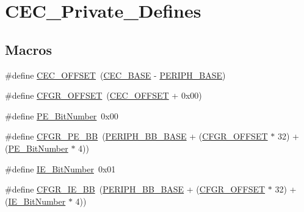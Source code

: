 \hypertarget{group___c_e_c___private___defines}{}\section{C\+E\+C\+\_\+\+Private\+\_\+\+Defines}
\label{group___c_e_c___private___defines}
\subsection*{Macros}
\begin{DoxyCompactItemize}
\item 
\#define \mbox{\hyperlink{group___c_e_c___private___defines_ga675324bd8967b75f32554f50210821af}{C\+E\+C\+\_\+\+O\+F\+F\+S\+ET}}~(\mbox{\hyperlink{group___peripheral__memory__map_gaacb77bc44b3f8c87ab98f241e760e440}{C\+E\+C\+\_\+\+B\+A\+SE}} -\/ \mbox{\hyperlink{group___peripheral__memory__map_ga9171f49478fa86d932f89e78e73b88b0}{P\+E\+R\+I\+P\+H\+\_\+\+B\+A\+SE}})
\item 
\#define \mbox{\hyperlink{group___c_e_c___private___defines_ga8682298330c3b9bae1992e4f1a0af985}{C\+F\+G\+R\+\_\+\+O\+F\+F\+S\+ET}}~(\mbox{\hyperlink{group___c_e_c___private___defines_ga675324bd8967b75f32554f50210821af}{C\+E\+C\+\_\+\+O\+F\+F\+S\+ET}} + 0x00)
\item 
\#define \mbox{\hyperlink{group___c_e_c___private___defines_ga321e547b9574b065127c882e09a4f7e7}{P\+E\+\_\+\+Bit\+Number}}~0x00
\item 
\#define \mbox{\hyperlink{group___c_e_c___private___defines_ga9d1f044508cda5ad8213bd7bc5c4363d}{C\+F\+G\+R\+\_\+\+P\+E\+\_\+\+BB}}~(\mbox{\hyperlink{group___peripheral__memory__map_gaed7efc100877000845c236ccdc9e144a}{P\+E\+R\+I\+P\+H\+\_\+\+B\+B\+\_\+\+B\+A\+SE}} + (\mbox{\hyperlink{group___r_c_c___private___defines_ga8682298330c3b9bae1992e4f1a0af985}{C\+F\+G\+R\+\_\+\+O\+F\+F\+S\+ET}} $\ast$ 32) + (\mbox{\hyperlink{group___c_e_c___private___defines_ga321e547b9574b065127c882e09a4f7e7}{P\+E\+\_\+\+Bit\+Number}} $\ast$ 4))
\item 
\#define \mbox{\hyperlink{group___c_e_c___private___defines_ga57731312db52f3498312a56e98166fad}{I\+E\+\_\+\+Bit\+Number}}~0x01
\item 
\#define \mbox{\hyperlink{group___c_e_c___private___defines_gac7fe35cf912353ca51a56c5f1f25b2fb}{C\+F\+G\+R\+\_\+\+I\+E\+\_\+\+BB}}~(\mbox{\hyperlink{group___peripheral__memory__map_gaed7efc100877000845c236ccdc9e144a}{P\+E\+R\+I\+P\+H\+\_\+\+B\+B\+\_\+\+B\+A\+SE}} + (\mbox{\hyperlink{group___r_c_c___private___defines_ga8682298330c3b9bae1992e4f1a0af985}{C\+F\+G\+R\+\_\+\+O\+F\+F\+S\+ET}} $\ast$ 32) + (\mbox{\hyperlink{group___c_e_c___private___defines_ga57731312db52f3498312a56e98166fad}{I\+E\+\_\+\+Bit\+Number}} $\ast$ 4))

\end{DoxyCompactItemize}
